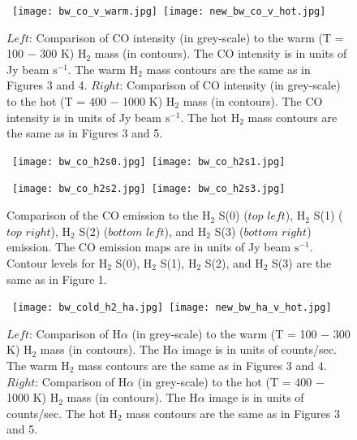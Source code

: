 \documentclass[manuscript]{aastex}
\begin{document}
\clearpage


\begin{figure}[!h]
\centerline{\hbox{\hspace{0.0in}
\texttt{[image: bw\_co\_v\_warm.jpg]}
\hspace{0.1in}
\texttt{[image: new\_bw\_co\_v\_hot.jpg]}}}
\caption{$Left$: Comparison of  CO intensity (in grey-scale) to the warm (T = 100 $-$ 300 K) $\mathrm{H_2}$ mass (in contours).  The CO intensity is in units of Jy beam $\mathrm{s^{-1}}$. The warm $\mathrm{H_2}$ mass contours are the same as in Figures 3 and 4.  $Right$: Comparison of CO intensity (in grey-scale) to the hot (T = 400 $-$ 1000 K) $\mathrm{H_2}$ mass (in contours).  The CO intensity is in units of Jy beam $\mathrm{s^{-1}}$. The hot $\mathrm{H_2}$ mass contours are the same as in Figures 3 and 5.
\label{fig7}}
\end{figure}

\clearpage


\begin{figure}[!h]
\centerline{\hbox{ \hspace{0.0in} 
\texttt{[image: bw\_co\_h2s0.jpg]}
\hspace{0.1in}
\texttt{[image: bw\_co\_h2s1.jpg]}}}
\end{figure}

\begin{figure}[!h]
\centerline{\hbox{\hspace{0.0in}
\texttt{[image: bw\_co\_h2s2.jpg]}
\hspace{0.1in}
\texttt{[image: bw\_co\_h2s3.jpg]}}}
\caption{Comparison of the CO emission to the $\mathrm{H_2}$ S(0) ($top$ $left$),  $\mathrm{H_2}$ S(1) ($top$ $right$),  $\mathrm{H_2}$ S(2) ($bottom$ $left$),  and $\mathrm{H_2}$ S(3) ($bottom$ $right$) emission.  The CO emission maps are in units of Jy beam $\mathrm{s^{-1}}$.  Contour levels for $\mathrm{H_2}$ S(0), $\mathrm{H_2}$ S(1), $\mathrm{H_2}$ S(2), and $\mathrm{H_2}$ S(3) are the same as in Figure 1.\label{fig8}}
\end{figure}

\clearpage


\begin{figure}[!h]
\centerline{\hbox{\hspace{0.0in}
\texttt{[image: bw\_cold\_h2\_ha.jpg]}
\hspace{0.1in}
\texttt{[image: new\_bw\_ha\_v\_hot.jpg]}}}
\caption{$Left$: Comparison of  H$\alpha$ (in grey-scale) to the warm (T = 100 $-$ 300 K) $\mathrm{H_2}$ mass (in contours).  The H$\alpha$ image is in units of counts/sec. The warm $\mathrm{H_2}$ mass contours are the same as in Figures 3 and 4.  $Right$: Comparison of H$\alpha$ (in grey-scale) to the hot (T = 400 $-$ 1000 K) $\mathrm{H_2}$ mass (in contours).  The H$\alpha$ image is in units of counts/sec. The hot $\mathrm{H_2}$ mass contours are the same as in Figures 3 and 5.
\label{fig9}}
\end{figure}
\end{document}
